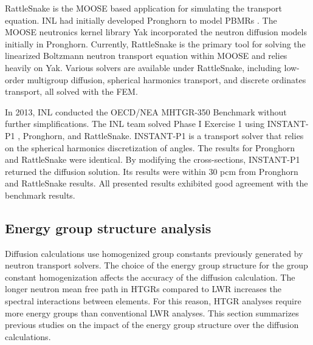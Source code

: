 RattleSnake \cite{wang_rattlesnake_2019} is the MOOSE \cite{gaston_moose_2009} based application for simulating the transport equation.
\gls{INL} had initially developed Pronghorn \cite{novak_pronghorn_2018} to model \glspl{PBMR} \cite{strydom_inl_2013}.
The MOOSE neutronics kernel library Yak incorporated the neutron diffusion models initially in Pronghorn.
Currently, RattleSnake is the primary tool for solving the linearized Boltzmann neutron transport equation within MOOSE and relies heavily on Yak.
Various solvers are available under RattleSnake, including low-order multigroup diffusion, spherical harmonics transport, and discrete ordinates transport, all solved with the \gls{FEM}.

In 2013, \gls{INL} conducted the OECD/NEA MHTGR-350 Benchmark \cite{oecd_nea_benchmark_2017}\cite{strydom_inl_2013} without further simplifications.
The \gls{INL} team solved Phase I Exercise 1 using INSTANT-P1 \cite{wang_krylov_2011}, Pronghorn, and RattleSnake.
INSTANT-P1 is a transport solver that relies on the spherical harmonics discretization of angles.
The results for Pronghorn and RattleSnake were identical.
By modifying the cross-sections, INSTANT-P1 returned the diffusion solution.
Its results were within 30 pcm from Pronghorn and RattleSnake results.
All presented results exhibited good agreement with the benchmark results.

\subsection{Energy group structure analysis}
\label{sec:energy-struct}

Diffusion calculations use homogenized group constants previously generated by neutron transport solvers.
The choice of the energy group structure for the group constant homogenization affects the accuracy of the diffusion calculation.
The longer neutron mean free path in \glspl{HTGR} compared to \gls{LWR} increases the spectral interactions between elements.
For this reason, HTGR analyses require more energy groups than conventional \gls{LWR} analyses.
This section summarizes previous studies on the impact of the energy group structure over the diffusion calculations.


